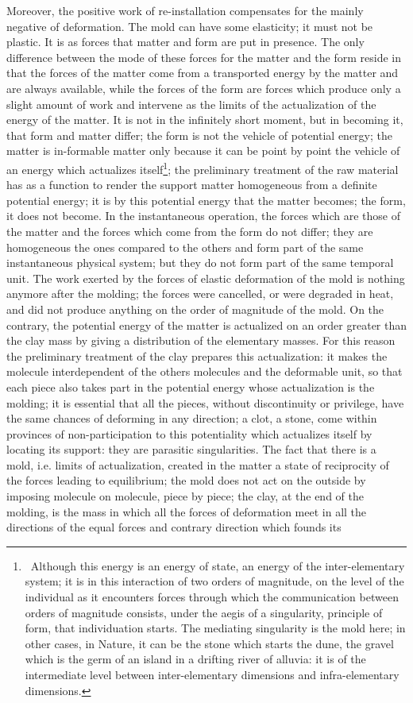 \documentclass[a4paper]{article}
\begin{document}
Moreover, the positive work of re-installation compensates for the mainly negative of deformation. The mold can have some elasticity; it must not be plastic. It is as forces that matter and form are put in presence. The only difference between the mode of these forces for the matter and the form reside in that the forces of the matter come from a transported energy by the matter and are always available, while the forces of the form are forces which produce only a slight amount of work and intervene as the limits of the actualization of the energy of the matter. It is not in the infinitely short moment, but in becoming it, that form and matter differ; the form is not the vehicle of potential energy; the matter is in-formable matter only because it can be point by point the vehicle of an energy which actualizes itself\footnote{\ Although this energy is an energy of state, an energy of the inter-elementary system; it is in this interaction of two orders of magnitude, on the level of the individual as it encounters forces through which the communication between orders of magnitude consists, under the aegis of a singularity, principle of form, that individuation starts. The mediating singularity is the mold here; in other cases, in Nature, it can be the stone which starts the dune, the gravel which is the germ of an island in a drifting river of alluvia: it is of the intermediate level between inter-elementary dimensions and infra-elementary dimensions.}; the preliminary treatment of the raw material has as a function to render the support matter homogeneous from a definite potential energy; it is by this potential energy that the matter becomes; the form, it does not become. In the instantaneous operation, the forces which are those of the matter and the forces which come from the form do not differ; they are homogeneous the ones compared to the others and form part of the same instantaneous physical system; but they do not form part of the same temporal unit. The work exerted by the forces of elastic deformation of the mold is nothing anymore after the molding; the forces were cancelled, or were degraded in heat, and did not produce anything on the order of magnitude of the mold. On the contrary, the potential energy of the matter is actualized on an order greater than the clay mass by giving a distribution of the elementary masses. For this reason the preliminary treatment of the clay prepares this actualization: it makes the molecule interdependent of the others molecules and the deformable unit, so that each piece also takes part in the potential energy whose actualization is the molding; it is essential that all the pieces, without discontinuity or privilege, have the same chances of deforming in any direction; a clot, a stone, come within provinces of non-participation to this potentiality which actualizes itself by locating its support: they are parasitic singularities. The fact that there is a mold, i.e. limits of actualization, created in the matter a state of reciprocity of the forces leading to equilibrium; the mold does not act on the outside by imposing molecule on molecule, piece by piece; the clay, at the end of the molding, is the mass in which all the forces of deformation meet in all the directions of the equal forces and contrary direction which founds its 
\end{document}
